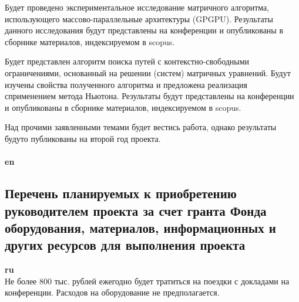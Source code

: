 \documentclass[12pt]{article}  %
\theoremstyle{remark}
\begin{document}
Будет проведено экспериментальное исследование матричного алгоритма, использующего массово-параллельные архитектуры (GPGPU).
Результаты данного исследования будут представлены на конференции и опубликованы в сборнике материалов, индексируемом в scopus.

Будет представлен алгоритм поиска путей с контекстно-свободными ограничениями, основанный на решении (систем) матричных уравнений. 
Будут изучены свойства полученного алгоритма и предложена реализация сприменением метода Ньютона.
Результаты будут представлены на конференции и опубликованы в сборнике материалов, индексируемом в scopus.

Над прочими заявленными темами будет вестись работа, однако результаты будуто публикованы на второй год проекта.
\\
\\
\textbf{en}\\

\subsection{Перечень планируемых к приобретению руководителем проекта за счет гранта Фонда оборудования, материалов, информационных и других ресурсов для выполнения проекта}

\textbf{ru}\\
%
Не более 800 тыс. рублей ежегодно будет тратиться на поездки с докладами на конференции. Расходов на оборудование не предполагается.
\end{document}
